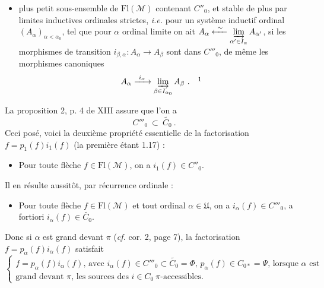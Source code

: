 \documentclass[11pt]{article}
\newcommand{\printedpage}[1]{\marginpar{\footnotesize p.~#1}}
\newcommand{\msp}[1]{\marginpar{\footnotesize [#1]}}
\newcommand{\cM}{\mathcal{M}}
\newcommand{\Fl}{\mathrm{Fl}}
\newcommand{\fU}{\mathfrak{U}}
\begin{document}
\setcounter{footnote}{1}%
\begin{itemize}[leftmargin=10em, labelwidth=9em, labelsep=1em, align=left]
\item[(1.19)\hfill $C'''_0 \ = $] plus petit sous-ensemble de $\Fl(\cM)$ contenant $C''_0$, et stable de plus par limites inductives ordinales strictes, \textit{i.e.} pour un système inductif ordinal $(A_\alpha)_{\alpha<\alpha_0}$, tel que pour $\alpha$ ordinal limite on ait $A_\alpha \xleftarrow{\ \sim\ } \varinjlim\limits_{\alpha' \in I_\alpha} A_{\alpha'}$, si les morphismes de transition $i_{\beta,\alpha} : A_\alpha \longrightarrow A_\beta$ sont dans $C'''_0$, de même les morphismes canoniques
\[
A_\alpha \xrightarrow{\ i_\alpha\ } \varinjlim_{\beta \in I_{\alpha_0}} A_\beta \ . \quad \footnotemark
\]
\end{itemize}

\printedpage{8}
\msp{page 9}

La proposition 2, p. 4 de XIII assure que l'on a
\[
C'''_0 \ \subset \ \widetilde{C_0} \ .
\]
Ceci posé, voici la deuxième propriété essentielle de la factorisation $f = p_1(f)i_1(f)$ (la première étant 1.17) :

\begin{itemize}[leftmargin=5em, labelwidth=4em, labelsep=1em, align=left]
\item[(1.20)] \qquad\qquad Pour toute flèche $f \in \Fl(\cM)$, on a $i_1(f) \in C''_0$.
\end{itemize}

Il en résulte aussitôt, par récurrence ordinale :

\begin{itemize}[leftmargin=5em, labelwidth=4em, labelsep=1em, align=left]
\item[(1.21)] \qquad Pour toute flèche $f \in \Fl(\cM)$ et tout ordinal $\alpha \in \fU$, on a $i_\alpha(f) \in C'''_0$, a fortiori $i_\alpha(f) \in \widetilde{C_0}$.
\end{itemize}

Donc si $\alpha$ est grand devant $\pi$ (\textit{cf.} cor. 2, page 7), la factorisation $f = p_\alpha(f)i_\alpha(f)$ satisfait
\[
\left\{
\begin{array}{l}
f = p_\alpha(f)i_\alpha(f)\text{, avec } i_\alpha(f) \in C'''_0 \subset \widetilde{C_0} = \Phi \text{, } p_\alpha(f) \in C_{0*} = \Psi \text{, lorsque } \alpha \text{ est}\\
\text{grand devant } \pi\text{, les sources des } i \in C_0 \ \pi\text{-accessibles.}
\end{array}
\right.
\tag*{(1.22)}
\]
\end{document}
